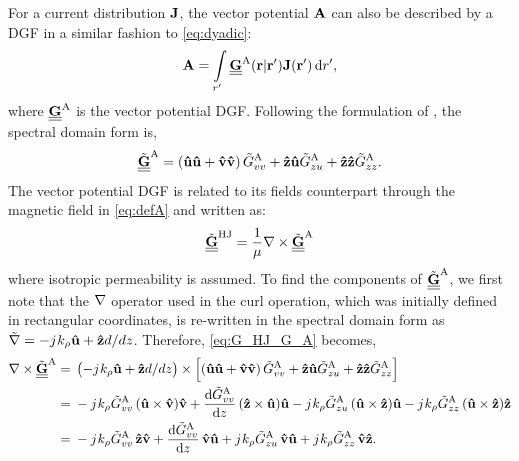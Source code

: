 For a current distribution $\mathbf{J}$, the vector potential $\mathbf{A}$ can also be described by a DGF in a similar fashion to \eqref{eq:dyadic}:
%
\begin{equation}
\mathbf{A} = \int\limits_{r'} \underline{\underline{\mathbf{G}}}^\mathrm{A}(\mathbf{r} | \mathbf{r'}) \mathbf{J}(\mathbf{r'}) \mathop{}\!\mathrm{d}{r'},
\label{eq:G^A}
\end{equation}
%
where $\underline{\underline{\mathbf{G}}}^\mathrm{A}$ is the vector potential DGF. Following the formulation of \cite{Michalski1997}, the spectral domain form is,
%
\begin{equation}
  \underline{\underline{\tilde{\mathbf{G}}}}^\mathrm{A} = \left( \mathbf{\hat u} \mathbf{\hat u} + \mathbf{\hat v} \mathbf{\hat v} \right) \tilde{G}^\mathrm{A}_{vv} + \mathbf{\hat z} \mathbf{\hat u} \tilde{G}^\mathrm{A}_{zu} + \mathbf{\hat z} \mathbf{\hat z} \tilde{G}^\mathrm{A}_{zz}.
  \label{eq:G^A_general_form}
\end{equation}
%
The vector potential DGF is related to its fields counterpart through the magnetic field in \eqref{eq:defA} and written as:
%
\begin{equation}
  \underline{\underline{\tilde{\mathbf{G}}}}^\mathrm{HJ} = \frac{1}{\mu} \nabla \times \underline{\underline{\tilde{\mathbf{G}}}}^\mathrm{A}
  \label{eq:G_HJ_G_A}
\end{equation}
%
where isotropic permeability is assumed. To find the components of $\underline{\underline{\tilde{\mathbf{G}}}}^\mathrm{A}$, we first note that the $\nabla$ operator used in the curl operation, which was initially defined in rectangular coordinates, is re-written in the spectral domain form as $\tilde{\nabla} = -{j}\mkern1mu k_{\rho} \mathbf{\hat u} + \mathbf{\hat z} d/{dz}$. Therefore, \eqref{eq:G_HJ_G_A} becomes,
%
\begin{equation}
  \begin{split}
    \nabla \times \underline{\underline{\tilde{\mathbf{G}}}}^\mathrm{A} ={}&  \left(-{j}\mkern1mu k_{\rho} \mathbf{\hat u} + \mathbf{\hat z} d/{dz} \right) \times \left[ \left( \mathbf{\hat u} \mathbf{\hat u} + \mathbf{\hat v} \mathbf{\hat v} \right) \tilde{G}^\mathrm{A}_{vv} + \mathbf{\hat z} \mathbf{\hat u} \tilde{G}^\mathrm{A}_{zu} + \mathbf{\hat z} \mathbf{\hat z} \tilde{G}^\mathrm{A}_{zz} \right] \\
    ={}& -{j}\mkern1mu k_{\rho} \tilde{G}^\mathrm{A}_{vv} \,(\mathbf{\hat u} \times \mathbf{\hat v})\mathbf{\hat v} + \dv{\tilde{G}^\mathrm{A}_{vv}}{z} \,(\mathbf{\hat z} \times \mathbf{\hat u})\mathbf{\hat u} - {j}\mkern1mu k_{\rho} \tilde{G}^\mathrm{A}_{zu} \,(\mathbf{\hat u} \times \mathbf{\hat z})\mathbf{\hat u} - {j}\mkern1mu k_{\rho} \tilde{G}^\mathrm{A}_{zz} \,(\mathbf{\hat u} \times \mathbf{\hat z})\mathbf{\hat z} \\
    ={}& -{j}\mkern1mu k_{\rho} \tilde{G}^\mathrm{A}_{vv} \,\mathbf{\hat z}\mathbf{\hat v} + \dv{\tilde{G}^\mathrm{A}_{vv}}{z} \,\mathbf{\hat v}\mathbf{\hat u} + {j}\mkern1mu k_{\rho} \tilde{G}^\mathrm{A}_{zu}\, \mathbf{\hat v}\mathbf{\hat u} + {j}\mkern1mu k_{\rho} \tilde{G}^\mathrm{A}_{zz}\, \mathbf{\hat v}\mathbf{\hat z}.
  \end{split}
  \label{eq:curl_of_GA}
\end{equation}
